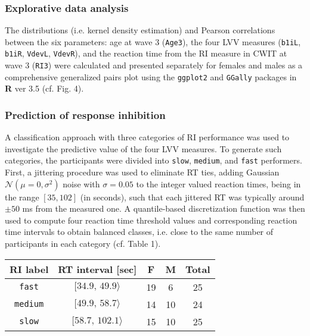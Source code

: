 \documentclass[10pt,letterpaper]{article}
\begin{document}
\subsubsection{Explorative data analysis} 

The distributions (i.e. kernel density estimation) and Pearson correlations between the six parameters: age at wave 3 ({\tt Age3}), the four LVV measures ({\tt b1iL}, {\tt b1iR}, {\tt VdevL}, {\tt VdevR}), and the reaction time from the RI measure in CWIT at wave 3 ({\tt RI3}) were calculated and presented separately for females and males as a comprehensive generalized pairs plot using the {\tt ggplot2} and {\tt GGally} packages in {\bf R} ver 3.5 (cf. Fig. 4). 


 \subsubsection{Prediction of response inhibition}
 
A classification approach with three categories of RI performance was used to investigate the predictive value of the four LVV measures. To generate such categories, the participants were divided into {\tt slow}, {\tt medium}, and {\tt fast} performers. First, a jittering procedure was used to eliminate RT ties, adding Gaussian $\mathcal{N}(\mu=0,\sigma^2)$ noise with $\sigma = 0.05$ to the integer valued reaction times, being in the range $[35, 102]$ (in seconds), such that each jittered RT was typically around $\pm 50$ ms from the measured one. 
A quantile-based discretization function was then used to compute four reaction time threshold values and corresponding reaction time intervals to obtain balanced classes, i.e. close to the same number of participants in each category (cf. Table 1).
\vspace{5mm}

 \begin{center}
\begin{tabular}{c|c|c|c|c}
{\bf RI label} & {\bf RT interval [sec]} & {\bf F} & {\bf M} & {\bf Total} \\
\hline
{\tt fast}   & $[ 34.9,\, 49.9 \rangle$ & 19 & 6 & 25 \\
{\tt medium} & $[ 49.9,\, 58.7 \rangle$ & 14 & 10 & 24 \\
{\tt slow}   & $[ 58.7, \, 102.1 \rangle$ & 15 & 10 & 25 \\
\hline
\end{tabular}
\end{center}
\end{document}
